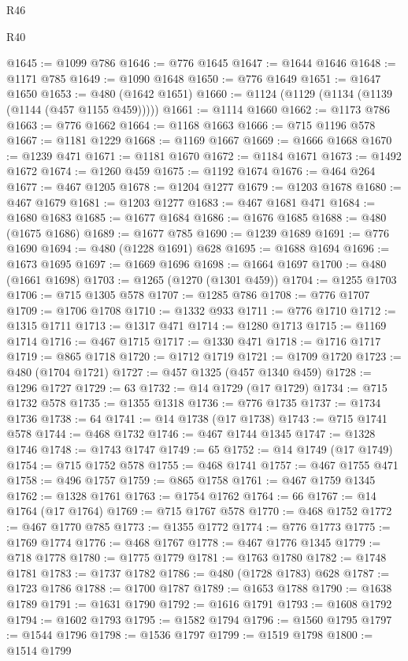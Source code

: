 \begin{lexlean}{R46}
\begin{lexlean}{R40}
\begin{coremodule}
{{{{{{{{{{{{{{{{{{{{{{{{{{{{{{{{{{{{{{{{{{{{{{{{{{{{{{{{{{{{{{{{{{{{{{{{{{{{{{{{{{{{{{{{{{{{{{{{{{{{{{{{{{{{{@1645 := @1099 @786
@1646 := @776 @1645
@1647 := @1644 @1646
@1648 := @1171 @785
@1649 := @1090 @1648
@1650 := @776 @1649
@1651 := @1647 @1650
@1653 := @480 (@1642 @1651)
@1660 := @1124 (@1129 (@1134 (@1139 (@1144 (@457 @1155 @459)))))
@1661 := @1114 @1660
@1662 := @1173 @786
@1663 := @776 @1662
@1664 := @1168 @1663
@1666 := @715 @1196 @578
@1667 := @1181 @1229
@1668 := @1169 @1667
@1669 := @1666 @1668
@1670 := @1239 @471
@1671 := @1181 @1670
@1672 := @1184 @1671
@1673 := @1492 @1672
@1674 := @1260 @459
@1675 := @1192 @1674
@1676 := @464 @264
@1677 := @467 @1205
@1678 := @1204 @1277
@1679 := @1203 @1678
@1680 := @467 @1679
@1681 := @1203 @1277
@1683 := @467 @1681 @471
@1684 := @1680 @1683
@1685 := @1677 @1684
@1686 := @1676 @1685
@1688 := @480 (@1675 @1686)
@1689 := @1677 @785
@1690 := @1239 @1689
@1691 := @776 @1690
@1694 := @480 (@1228 @1691) @628
@1695 := @1688 @1694
@1696 := @1673 @1695
@1697 := @1669 @1696
@1698 := @1664 @1697
@1700 := @480 (@1661 @1698)
@1703 := @1265 (@1270 (@1301 @459))
@1704 := @1255 @1703
@1706 := @715 @1305 @578
@1707 := @1285 @786
@1708 := @776 @1707
@1709 := @1706 @1708
@1710 := @1332 @933
@1711 := @776 @1710
@1712 := @1315 @1711
@1713 := @1317 @471
@1714 := @1280 @1713
@1715 := @1169 @1714
@1716 := @467 @1715
@1717 := @1330 @471
@1718 := @1716 @1717
@1719 := @865 @1718
@1720 := @1712 @1719
@1721 := @1709 @1720
@1723 := @480 (@1704 @1721)
@1727 := @457 @1325 (@457 @1340 @459)
@1728 := @1296 @1727
@1729 := 63
@1732 := @14 @1729 (@17 @1729)
@1734 := @715 @1732 @578
@1735 := @1355 @1318
@1736 := @776 @1735
@1737 := @1734 @1736
@1738 := 64
@1741 := @14 @1738 (@17 @1738)
@1743 := @715 @1741 @578
@1744 := @468 @1732
@1746 := @467 @1744 @1345
@1747 := @1328 @1746
@1748 := @1743 @1747
@1749 := 65
@1752 := @14 @1749 (@17 @1749)
@1754 := @715 @1752 @578
@1755 := @468 @1741
@1757 := @467 @1755 @471
@1758 := @496 @1757
@1759 := @865 @1758
@1761 := @467 @1759 @1345
@1762 := @1328 @1761
@1763 := @1754 @1762
@1764 := 66
@1767 := @14 @1764 (@17 @1764)
@1769 := @715 @1767 @578
@1770 := @468 @1752
@1772 := @467 @1770 @785
@1773 := @1355 @1772
@1774 := @776 @1773
@1775 := @1769 @1774
@1776 := @468 @1767
@1778 := @467 @1776 @1345
@1779 := @718 @1778
@1780 := @1775 @1779
@1781 := @1763 @1780
@1782 := @1748 @1781
@1783 := @1737 @1782
@1786 := @480 (@1728 @1783) @628
@1787 := @1723 @1786
@1788 := @1700 @1787
@1789 := @1653 @1788
@1790 := @1638 @1789
@1791 := @1631 @1790
@1792 := @1616 @1791
@1793 := @1608 @1792
@1794 := @1602 @1793
@1795 := @1582 @1794
@1796 := @1560 @1795
@1797 := @1544 @1796
@1798 := @1536 @1797
@1799 := @1519 @1798
@1800 := @1514 @1799
}}}}}}}}}}}}}}}}}}}}}}}}}}}}}}}}}}}}}}}}}}}}}}}}}}}}}}}}}}}}}}}}}}}}}}}}}}}}}}}}}}}}}}}}}}}}}}}}}}}}}}}}}}}}}
\end{coremodule}
\end{lexlean}
\end{lexlean}
